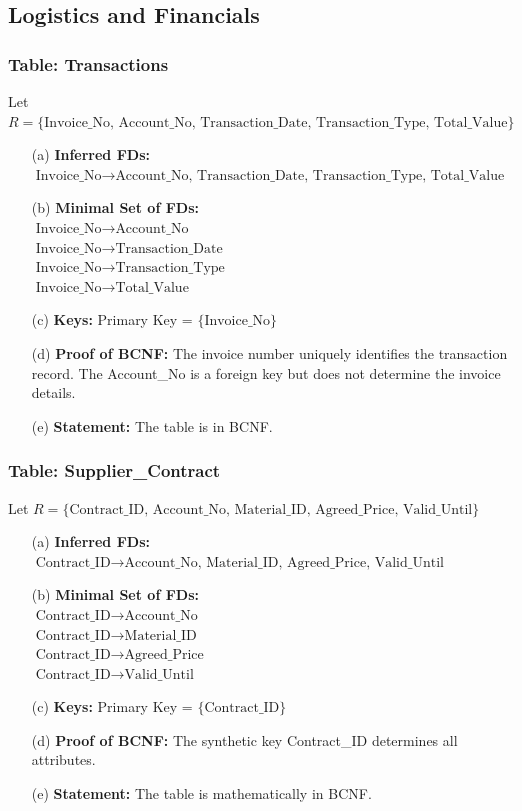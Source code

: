 \documentclass[12pt, a4paper]{article}
\begin{document}
\subsection{Logistics and Financials}

\subsubsection{Table: Transactions}
Let $R = \{ \text{Invoice\_No, Account\_No, Transaction\_Date, Transaction\_Type, Total\_Value} \}$
\begin{enumerate}
    \item[(a)] \textbf{Inferred FDs:} $\text{Invoice\_No} \rightarrow \text{Account\_No, Transaction\_Date, Transaction\_Type, Total\_Value}$
    \item[(b)] \textbf{Minimal Set of FDs:} 
    \\ $\text{Invoice\_No} \rightarrow \text{Account\_No}$
    \\ $\text{Invoice\_No} \rightarrow \text{Transaction\_Date}$
    \\ $\text{Invoice\_No} \rightarrow \text{Transaction\_Type}$
    \\ $\text{Invoice\_No} \rightarrow \text{Total\_Value}$
    \item[(c)] \textbf{Keys:} Primary Key = $\{ \text{Invoice\_No} \}$
    \item[(d)] \textbf{Proof of BCNF:} The invoice number uniquely identifies the transaction record. The Account\_No is a foreign key but does not determine the invoice details.
    \item[(e)] \textbf{Statement:} The table is in BCNF.
\end{enumerate}

\subsubsection{Table: Supplier\_Contract}
Let $R = \{ \text{Contract\_ID, Account\_No, Material\_ID, Agreed\_Price, Valid\_Until} \}$
\begin{enumerate}
    \item[(a)] \textbf{Inferred FDs:} $\text{Contract\_ID} \rightarrow \text{Account\_No, Material\_ID, Agreed\_Price, Valid\_Until}$
    \item[(b)] \textbf{Minimal Set of FDs:} 
    \\ $\text{Contract\_ID} \rightarrow \text{Account\_No}$
    \\ $\text{Contract\_ID} \rightarrow \text{Material\_ID}$
    \\ $\text{Contract\_ID} \rightarrow \text{Agreed\_Price}$
    \\ $\text{Contract\_ID} \rightarrow \text{Valid\_Until}$
    \item[(c)] \textbf{Keys:} Primary Key = $\{ \text{Contract\_ID} \}$
    \item[(d)] \textbf{Proof of BCNF:} The synthetic key Contract\_ID determines all attributes. 
    \item[(e)] \textbf{Statement:} The table is mathematically in BCNF.
\end{enumerate}
\end{document}
